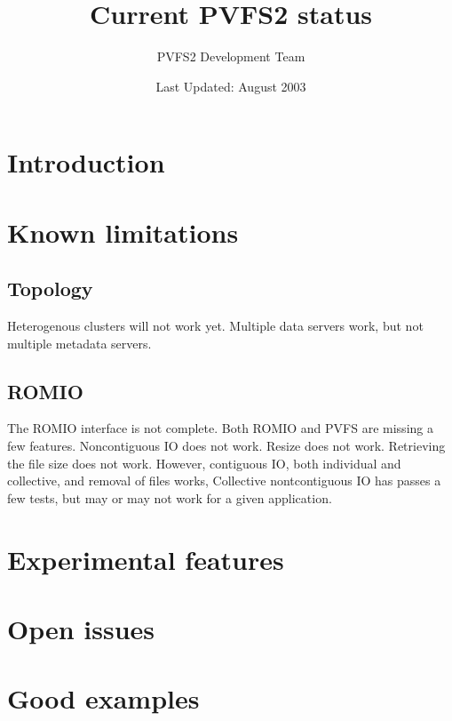 \documentclass[11pt, letterpaper]{article}
\title{Current PVFS2 status}
\author{ PVFS2 Development Team }
\date{ Last Updated: August 2003 }
\begin{document}
\maketitle

\tableofcontents

\newpage

\thispagestyle{empty}

\setlength{\parindent}{0.0cm}

\section{Introduction}
\section{Known limitations}
\subsection{Topology}

Heterogenous clusters will not work yet.  Multiple data servers work, but not
multiple metadata servers.

\subsection{ROMIO}

The ROMIO interface is not complete.  Both ROMIO and PVFS are missing a few
features.  Noncontiguous IO does not work.   Resize does not work.   Retrieving
the file size does not work.  However, contiguous IO, both individual and
collective, and removal of files works,   Collective nontcontiguous IO has
passes a few tests, but may or may not work for a given application.  

\section{Experimental features}
\section{Open issues}
\section{Good examples}
\end{document}
